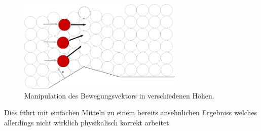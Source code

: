 \begin{Spacing}{\mylinespace}
\begin{figure}[h!]
			\includegraphics[width=0.7\textwidth]{graphics/Phys_flow2.png}
			\caption{ Manipulation des Bewegungsvektors in verschiedenen Höhen. }
			\label{fig:flow1}
		\end{figure}
		Dies führt mit einfachen Mitteln zu einem bereits ansehnlichen Ergebniss
		welches allerdings nicht wirklich physikalisch korrekt arbeitet.
\end{Spacing}
\newpage
\clearpage
